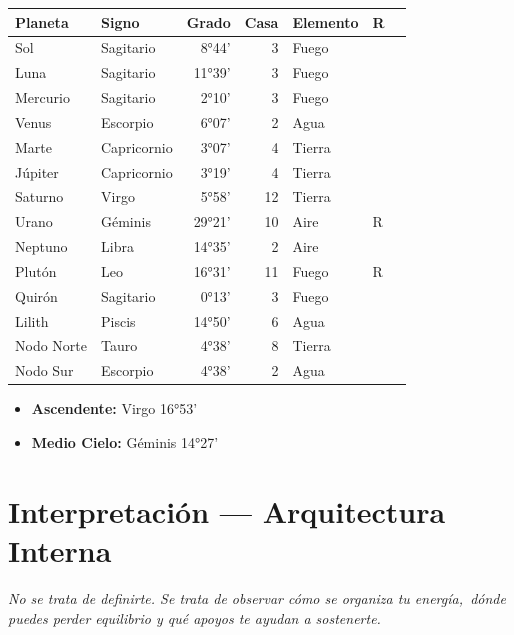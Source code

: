 \documentclass[11pt,a4paper]{article}\usepackage[utf8]{inputenc}
\begin{document}
\begin{center}
\begin{tabular}{llrrlll}
  \toprule
  \textbf{Planeta} & \textbf{Signo} & \textbf{Grado} & \textbf{Casa} &
  \textbf{Elemento} & \textbf{R} \\
  \midrule
  Sol & Sagitario & 8°44' & 3 & Fuego &  \\
  Luna & Sagitario & 11°39' & 3 & Fuego &  \\
  Mercurio & Sagitario & 2°10' & 3 & Fuego &  \\
  Venus & Escorpio & 6°07' & 2 & Agua &  \\
  Marte & Capricornio & 3°07' & 4 & Tierra &  \\
  Júpiter & Capricornio & 3°19' & 4 & Tierra &  \\
  Saturno & Virgo & 5°58' & 12 & Tierra &  \\
  Urano & Géminis & 29°21' & 10 & Aire & R \\
  Neptuno & Libra & 14°35' & 2 & Aire &  \\
  Plutón & Leo & 16°31' & 11 & Fuego & R \\
  Quirón & Sagitario & 0°13' & 3 & Fuego &  \\
  Lilith & Piscis & 14°50' & 6 & Agua &  \\
  Nodo Norte & Tauro & 4°38' & 8 & Tierra &  \\
  Nodo Sur & Escorpio & 4°38' & 2 & Agua &  \\
  \bottomrule
\end{tabular}
\end{center}

\vspace{0.5cm}
\begin{itemize}
  \item \textbf{Ascendente:} Virgo 16°53'
  \item \textbf{Medio Cielo:} Géminis 14°27'
\end{itemize}

\newpage

\section{Interpretación — Arquitectura Interna}

\begin{center}
{\small\itshape
No se trata de definirte. Se trata de observar cómo se organiza tu energía,\
dónde puedes perder equilibrio y qué apoyos te ayudan a sostenerte.
}
\end{center}
\end{document}
